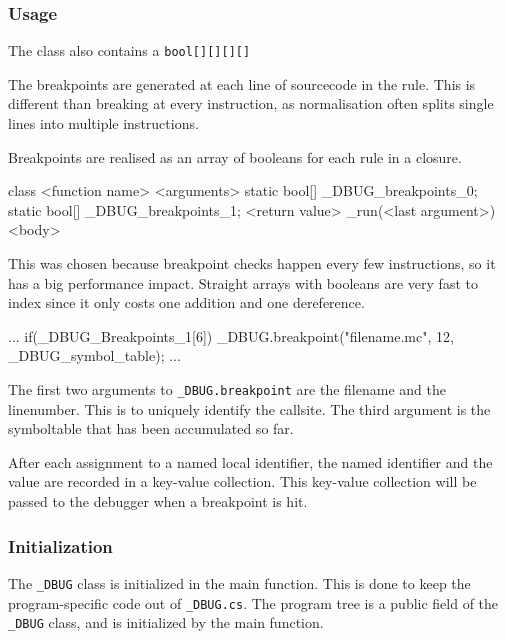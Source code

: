 \subsubsection{Usage}

The class also contains a \verb|bool[][][][]| 

The breakpoints are generated at each line of sourcecode in the rule.
This is different than breaking at every instruction, as normalisation often splits single lines into multiple instructions.

Breakpoints are realised as an array of booleans for each rule in a closure.

\begin{code}
    class <function name>{
        <arguments>
        static bool[] _DBUG_breakpoints_0;
        static bool[] _DBUG_breakpoints_1;
        <return value> _run(<last argument>){
            <body> 
        }
    }
\end{code}

This was chosen because breakpoint checks happen every few instructions, so it has a big performance impact.
Straight arrays with booleans are very fast to index since it only costs one addition and one dereference.

\begin{code}
    ...
    if(_DBUG_Breakpoints_1[6]){
        _DBUG.breakpoint("filename.mc", 12, 
                         _DBUG_symbol_table);
    }
    ...
\end{code}

The first two arguments to \verb|_DBUG.breakpoint| are the filename and the linenumber.
This is to uniquely identify the callsite.
The third argument is the symboltable that has been accumulated so far.

After each assignment to a named local identifier, the named identifier and the value are recorded in a key-value collection. 
This key-value collection will be passed to the debugger when a breakpoint is hit.

\subsubsection{Initialization}
The \verb|_DBUG| class is initialized in the main function.
This is done to keep the program-specific code out of \verb|_DBUG.cs|.
The program tree is a public field of the \verb|_DBUG| class, and is initialized by the main function.



